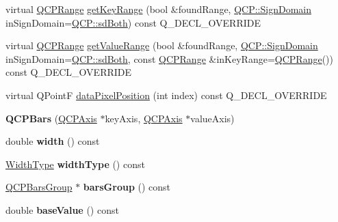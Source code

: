 \begin{DoxyCompactItemize}
virtual \hyperlink{class_q_c_p_range}{Q\+C\+P\+Range} \hyperlink{class_q_c_p_bars_ac5a3854774d9d9cd129b1eae1426de2d}{get\+Key\+Range} (bool \&found\+Range, \hyperlink{namespace_q_c_p_afd50e7cf431af385614987d8553ff8a9}{Q\+C\+P\+::\+Sign\+Domain} in\+Sign\+Domain=\hyperlink{namespace_q_c_p_afd50e7cf431af385614987d8553ff8a9a3dee7e9cd2fedce9253b83e172626a6c}{Q\+C\+P\+::sd\+Both}) const Q\+\_\+\+D\+E\+C\+L\+\_\+\+O\+V\+E\+R\+R\+I\+DE
\item 
virtual \hyperlink{class_q_c_p_range}{Q\+C\+P\+Range} \hyperlink{class_q_c_p_bars_a02cee4bf94d48a1e5f6fc185d9a10477}{get\+Value\+Range} (bool \&found\+Range, \hyperlink{namespace_q_c_p_afd50e7cf431af385614987d8553ff8a9}{Q\+C\+P\+::\+Sign\+Domain} in\+Sign\+Domain=\hyperlink{namespace_q_c_p_afd50e7cf431af385614987d8553ff8a9a3dee7e9cd2fedce9253b83e172626a6c}{Q\+C\+P\+::sd\+Both}, const \hyperlink{class_q_c_p_range}{Q\+C\+P\+Range} \&in\+Key\+Range=\hyperlink{class_q_c_p_range}{Q\+C\+P\+Range}()) const Q\+\_\+\+D\+E\+C\+L\+\_\+\+O\+V\+E\+R\+R\+I\+DE
\item 
virtual Q\+PointF \hyperlink{class_q_c_p_bars_a55cdaf565cd3384158d1f7f89533bc2d}{data\+Pixel\+Position} (int index) const Q\+\_\+\+D\+E\+C\+L\+\_\+\+O\+V\+E\+R\+R\+I\+DE
\item 
\mbox{\label{class_q_c_p_bars_a64006999ad9dff308f40df41cef176ad}} 
{\bfseries Q\+C\+P\+Bars} (\hyperlink{class_q_c_p_axis}{Q\+C\+P\+Axis} $\ast$key\+Axis, \hyperlink{class_q_c_p_axis}{Q\+C\+P\+Axis} $\ast$value\+Axis)
\item 
\mbox{\label{class_q_c_p_bars_abe7eb3987d8711f45829db879aee2280}} 
double {\bfseries width} () const
\item 
\mbox{\label{class_q_c_p_bars_a4c103fb405a45f47853e0345f0c6e708}} 
\hyperlink{class_q_c_p_bars_a65dbbf1ab41cbe993d71521096ed4649}{Width\+Type} {\bfseries width\+Type} () const
\item 
\mbox{\label{class_q_c_p_bars_a5eef59840b68d205df4e0c3df5f97633}} 
\hyperlink{class_q_c_p_bars_group}{Q\+C\+P\+Bars\+Group} $\ast$ {\bfseries bars\+Group} () const
\item 
\mbox{\label{class_q_c_p_bars_a29a7b3b86f80b2a04bd1f9ec0ebaf422}} 
double {\bfseries base\+Value} () const
\item 

\end{DoxyCompactItemize}
